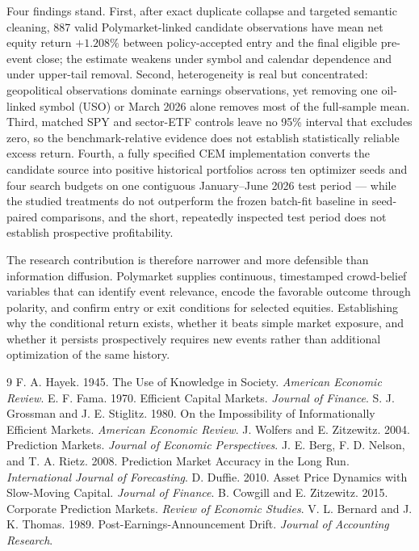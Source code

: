 \documentclass[sigconf,anonymous]{acmart}
\begin{document}
Four findings stand. First, after exact duplicate collapse and targeted semantic cleaning, 887 valid Polymarket-linked candidate observations have mean net equity return $+1.208\%$ between policy-accepted entry and the final eligible pre-event close; the estimate weakens under symbol and calendar dependence and under upper-tail removal. Second, heterogeneity is real but concentrated: geopolitical observations dominate earnings observations, yet removing one oil-linked symbol (USO) or March 2026 alone removes most of the full-sample mean. Third, matched SPY and sector-ETF controls leave no 95\% interval that excludes zero, so the benchmark-relative evidence does not establish statistically reliable excess return. Fourth, a fully specified CEM implementation converts the candidate source into positive historical portfolios across ten optimizer seeds and four search budgets on one contiguous January--June 2026 test period --- while the studied treatments do not outperform the frozen batch-fit baseline in seed-paired comparisons, and the short, repeatedly inspected test period does not establish prospective profitability.

The research contribution is therefore narrower and more defensible than information diffusion. Polymarket supplies continuous, timestamped crowd-belief variables that can identify event relevance, encode the favorable outcome through polarity, and confirm entry or exit conditions for selected equities. Establishing why the conditional return exists, whether it beats simple market exposure, and whether it persists prospectively requires new events rather than additional optimization of the same history.

{\small
\begin{thebibliography}{9}
 F. A. Hayek. 1945. The Use of Knowledge in Society. \emph{American Economic Review}.
 E. F. Fama. 1970. Efficient Capital Markets. \emph{Journal of Finance}.
 S. J. Grossman and J. E. Stiglitz. 1980. On the Impossibility of Informationally Efficient Markets. \emph{American Economic Review}.
 J. Wolfers and E. Zitzewitz. 2004. Prediction Markets. \emph{Journal of Economic Perspectives}.
 J. E. Berg, F. D. Nelson, and T. A. Rietz. 2008. Prediction Market Accuracy in the Long Run. \emph{International Journal of Forecasting}.
 D. Duffie. 2010. Asset Price Dynamics with Slow-Moving Capital. \emph{Journal of Finance}.
 B. Cowgill and E. Zitzewitz. 2015. Corporate Prediction Markets. \emph{Review of Economic Studies}.
 V. L. Bernard and J. K. Thomas. 1989. Post-Earnings-Announcement Drift. \emph{Journal of Accounting Research}.
\end{thebibliography}
}
\end{document}
